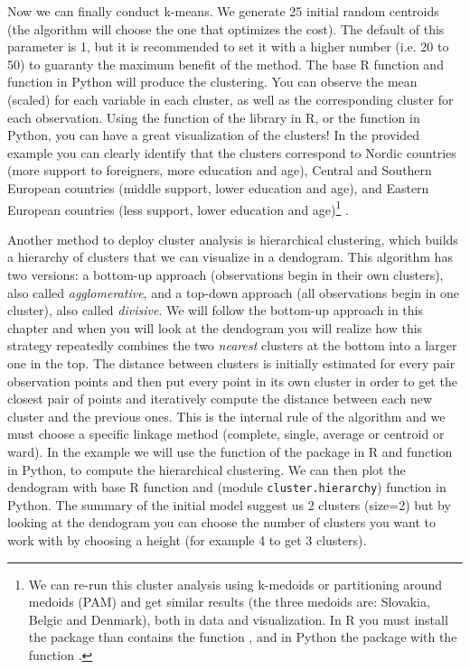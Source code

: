 Now we can finally conduct k-means. We generate 25 initial random centroids (the algorithm will choose the one that optimizes the cost). The default of this parameter is 1, but it is recommended to set it with a higher number (i.e. 20 to 50) to guaranty the maximum benefit of the method. The base R function  and  function  in Python will produce the clustering. You can observe the mean (scaled) for each variable in each cluster, as well as the corresponding cluster for each observation. Using the function  of the library  in R, or the  function  in Python, you can have a great visualization of the clusters! In the provided example you can clearly identify that the clusters correspond to Nordic countries (more support to foreigners, more education and age), Central and Southern European countries (middle support, lower education and age), and Eastern European countries (less support, lower education and age)\footnote{We can re-run this cluster analysis using k-medoids or partitioning around medoids (PAM) and get similar results (the three medoids are: Slovakia, Belgic and Denmark), both in data and visualization. In R you must install the package  than contains the function , and in Python the package  with the function .} .


Another method to deploy cluster analysis is hierarchical clustering, which builds a hierarchy of clusters that we can visualize in a dendogram.  This algorithm has two versions: a bottom-up approach (observations begin in their own clusters), also called \textit{agglomerative}, and a top-down approach (all observations begin in one cluster), also called \textit{divisive}. We will follow the bottom-up approach in this chapter and when you will look at the dendogram you will realize how this strategy repeatedly combines the two \textit{nearest} clusters at the bottom into a larger one in the top. The distance between clusters is initially estimated for every pair observation points and then put every point in its own cluster in order to get the closest pair of points and iteratively compute the distance between each new cluster and the previous ones. This is the internal rule of the algorithm and we must choose a specific linkage method (complete, single, average or centroid or ward). In the example we will use the function  of the package  in R and  function  in Python, to compute the hierarchical clustering. We can then plot the dendogram  with base R function  and  (module \texttt{cluster.hierarchy}) function  in Python. The summary of the initial model suggest us 2 clusters (size=2) but by looking at the dendogram you can choose the number of clusters you want to work with by choosing a height (for example 4 to get 3 clusters). 

